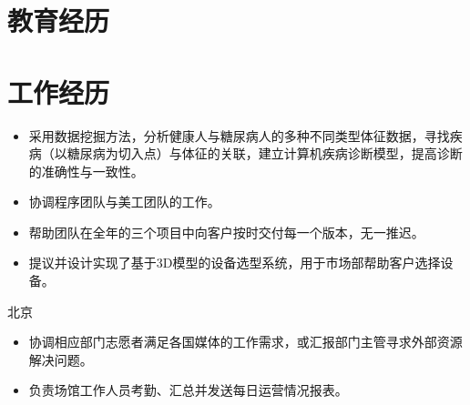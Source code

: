 \documentclass[11pt,a4paper,sans]{moderncv/moderncv}
\begin{document}
\maketitle

\section{教育经历}


\section{工作经历}
{
\begin{itemize}
	\item 采用数据挖掘方法，分析健康人与糖尿病人的多种不同类型体征数据，寻找疾病（以糖尿病为切入点）与体征的关联，建立计算机疾病诊断模型，提高诊断的准确性与一致性。
\end{itemize}
}

{
\begin{itemize}
	\item 协调程序团队与美工团队的工作。
	\item 帮助团队在全年的三个项目中向客户按时交付每一个版本，无一推迟。
\end{itemize}
}

{
\begin{itemize}
	\item 提议并设计实现了基于3D模型的设备选型系统，用于市场部帮助客户选择设备。
\end{itemize}
}

{北京}{}
{
\begin{itemize}
	\item 协调相应部门志愿者满足各国媒体的工作需求，或汇报部门主管寻求外部资源解决问题。
	\item 负责场馆工作人员考勤、汇总并发送每日运营情况报表。
\end{itemize}
}
\end{document}
